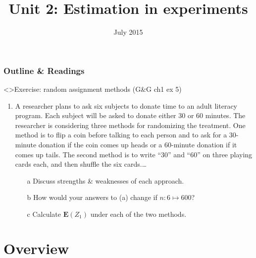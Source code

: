 




%

%




\title{Unit 2: Estimation in experiments}
\date{July 2015}




  \begin{frame}
    \frametitle{Outline \& Readings}

\tableofcontents[subsectionstyle=show/hide/hide]

\end{frame}


\begin{frame}<\nottheirhandout>{Exercise: random assignment methods}
{\footnotesize (G\&G ch1 ex 5)}

\begin{enumerate} \addtocounter{enumi}{-1}
\item
A researcher plans to ask six subjects to donate time to an adult
literacy program. Each subject will be asked to donate either 30 or 60
minutes. The researcher is considering three methods for randomizing
the treatment. One method is to flip a coin before talking to each
person and to ask for a 30-minute donation if the coin comes up heads
or a 60-minute donation if it comes up tails. The second method is to
write ``30'' and ``60'' on three playing cards each, and then shuffle
the six cards.\ldots
  
\begin{itemize}
\item[a] Discuss strengths \& weaknesses of each approach.
\item[b] How would your answers to (a) change if $n: 6 \mapsto 600$?
\item[c] Calculate $\mathbf{E}(Z_{1})$ under each of the two methods.
\end{itemize}
\end{enumerate}

\end{frame}

\section{Overview}



